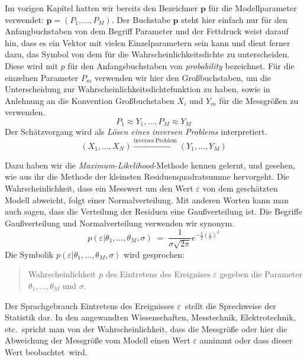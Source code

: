 Im vorigen Kapitel hatten wir bereits den Bezeichner $\mathbf{p}$ für die Modellparameter
verwendet: $\mathbf{p} = (P_1, \dots, P_M)$.
Der Buchstabe $\mathbf{p}$ steht hier einfach nur für den Anfangbuchstaben
von dem Begriff Parameter und der Fettdruck weist darauf hin, dass es ein Vektor mit vielen
Einzelparametern sein kann und dient ferner dazu, das Symbol von dem für die Wahrscheinlichkeitsdichte
zu unterscheiden. Diese wird mit $p$ für den Anfangsbuchstaben von \textsl{probability} bezeichnet.
Für die einzelnen Parameter $P_m$ verwenden wir hier den Großbuchstaben, um die Unterscheidung zur
Wahrscheinlichkeitsdichtefunktion zu haben, sowie in Anlehnung an die Konvention Großbuchstaben
$X_i$ und $Y_m$ für die Messgrößen zu verwenden.
\begin{equation}
P_1 \approx Y_1, \dots, P_M \approx Y_M
\end{equation}
Der Schätzvorgang wird als \textsl{Lösen eines inversen Problems} interpretiert.
\begin{equation}
(X_1, \dots, X_N) \xrightarrow{\mathrm{inverses \; Problem}} (Y_1, \dots, Y_M)
\label{inverseProblemEq}
\end{equation}

Dazu haben wir die \textsl{Maximum-Likelihood}-Methode kennen gelernt, und gesehen, wie
aus ihr die Methode der kleinsten Residuenquadratsumme hervorgeht. Die Wahrscheinlichkeit,
dass ein Messwert um den Wert $\varepsilon$ von dem geschätzten Modell abweicht, folgt
einer Normalverteilung. Mit anderen Worten kann man auch sagen, dass
die Verteilung der Residuen eine Gaußverteilung ist.
Die Begriffe Gaußverteilung und Normalverteilung verwenden wir synonym.
\begin{equation}
p(\varepsilon | \theta_1,\dots,\theta_M, \sigma) \; = \; \frac{1}{\sigma \sqrt{2 \pi}}
e^{-\frac{1}{2} \left(\frac{\varepsilon}{\sigma}\right)^2}
\label{Maximumlikelihood1}
\end{equation}
Die Symbolik $p(\varepsilon | \theta_1,\dots,\theta_M, \sigma)$ wird gesprochen:
\begin{quote}
Wahrscheinlichkeit $p$ des Eintretens des Ereignises $\varepsilon$
gegeben die Parameter $\theta_1,\dots,\theta_M$ und $\sigma$.
\end{quote}
Der Sprachgebrauch \glqq Eintretens des Ereignisses $\varepsilon$\grqq ~stellt die
Sprechweise der Statistik dar. In den angewandten Wissenschaften, Messtechnik,
Elektrotechnik, etc.\ spricht man von der Wahrscheinlichkeit, dass die Messgröße
oder hier die Abweichung der Messgröße vom Modell einen Wert $\varepsilon$ annimmt oder
dass dieser Wert \glqq beobachtet\grqq ~wird.

